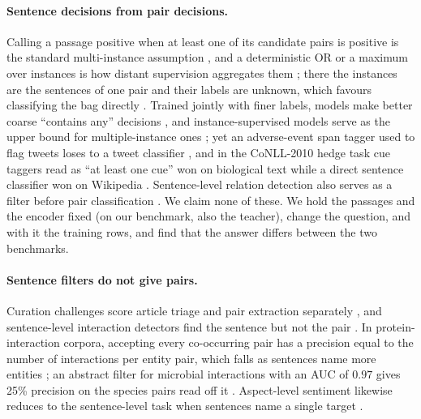 \documentclass[11pt]{article}
\begin{document}
\paragraph{Sentence decisions from pair decisions.}
Calling a passage positive when at least one of its candidate pairs is positive is the standard
multi-instance assumption \citep{dietterich1997solving}, and a deterministic OR or a maximum over
instances is how distant supervision aggregates them \citep{hoffmann2011knowledge,zeng2015distant}; there the
instances are the sentences of one pair and their labels are unknown, which favours classifying the
bag directly \citep{ilse2018attention}. Trained jointly with finer labels, models make better coarse
``contains any'' decisions \citep{rei2019jointly,dasanmartino2019fine}, and instance-supervised
models serve as the upper bound for multiple-instance ones \citep{li2021dual}; yet an adverse-event
span tagger used to flag tweets loses to a tweet classifier \citep{magge2021deepademiner}, and in
the CoNLL-2010 hedge task cue taggers read as ``at least one cue'' won on biological text while
a direct sentence classifier won on Wikipedia \citep{farkas2010conll}. Sentence-level relation
detection also serves as a filter before pair classification
\citep{chowdhury2013exploiting,xie2021revisiting}. We claim none of these. We hold the passages and
the encoder fixed (on our benchmark, also the teacher), change the question, and with it the
training rows, and find that the answer differs between the two benchmarks.

\paragraph{Sentence filters do not give pairs.}
Curation challenges score article triage and pair extraction separately
\citep{krallinger2008overview,islamajdogan2019overview}, and sentence-level interaction detectors
find the sentence but not the pair \citep{polajnar2011protein}. In protein-interaction corpora,
accepting every co-occurring pair has a precision equal to the number of interactions per entity
pair, which falls as sentences name more entities \citep{pyysalo2008comparative,tikk2013detailed};
an abstract filter for microbial interactions with an AUC of $0.97$ gives 25\% precision on the
species pairs read off it \citep{lim2016minter}. Aspect-level sentiment likewise reduces to the
sentence-level task when sentences name a single target \citep{jiang2019challenge}.
\end{document}

